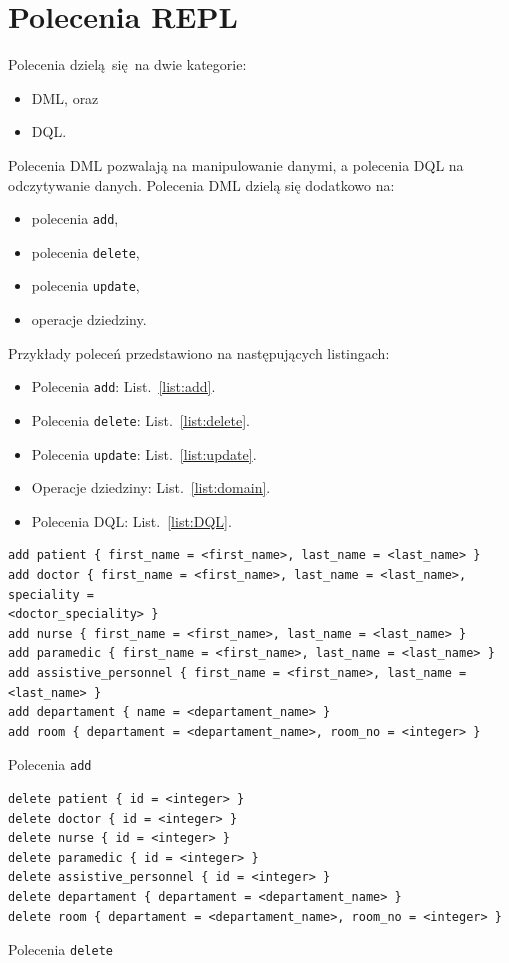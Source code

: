 \documentclass[a4paper, 10pt]{article}
\begin{document}
\section{Polecenia REPL}
    Polecenia dzielą się na dwie kategorie:
    \begin{itemize}
        \item DML, oraz
        \item DQL.
    \end{itemize}
    Polecenia DML pozwalają na manipulowanie danymi, a polecenia DQL
    na odczytywanie danych. Polecenia DML dzielą się dodatkowo na:
    \begin{itemize}
        \item polecenia \texttt{add},
        \item polecenia \texttt{delete},
        \item polecenia \texttt{update},
        \item operacje dziedziny.
    \end{itemize}
    Przykłady poleceń przedstawiono na następujących listingach:
    \begin{itemize}
        \item Polecenia \texttt{add}: List.~\ref{list:add}.
        \item Polecenia \texttt{delete}: List.~\ref{list:delete}.
        \item Polecenia \texttt{update}: List.~\ref{list:update}.
        \item Operacje dziedziny: List.~\ref{list:domain}.
        \item Polecenia DQL: List.~\ref{list:DQL}.
    \end{itemize}
    \begin{listing}
        \begin{verbatim}
add patient { first_name = <first_name>, last_name = <last_name> }
add doctor { first_name = <first_name>, last_name = <last_name>, speciality =
<doctor_speciality> }
add nurse { first_name = <first_name>, last_name = <last_name> }
add paramedic { first_name = <first_name>, last_name = <last_name> }
add assistive_personnel { first_name = <first_name>, last_name = <last_name> }
add departament { name = <departament_name> }
add room { departament = <departament_name>, room_no = <integer> }
        \end{verbatim}
        \caption{Polecenia \texttt{add}}
        \label{list:add}
    \end{listing}
    \begin{listing}
        \begin{verbatim}
delete patient { id = <integer> }
delete doctor { id = <integer> }
delete nurse { id = <integer> }
delete paramedic { id = <integer> }
delete assistive_personnel { id = <integer> }
delete departament { departament = <departament_name> }
delete room { departament = <departament_name>, room_no = <integer> }
        \end{verbatim}
        \caption{Polecenia \texttt{delete}}
        \label{list:delete}
    \end{listing}
\end{document}
